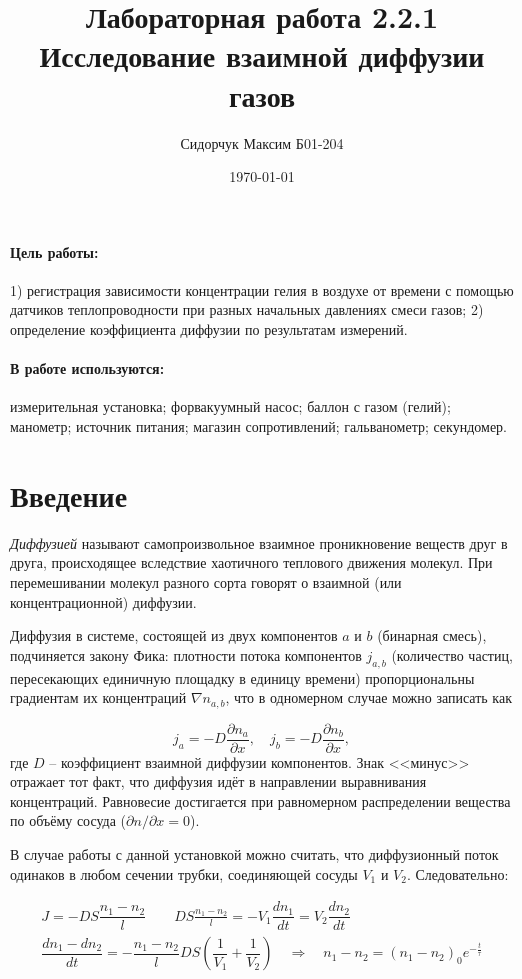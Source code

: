 \documentclass[a4paper,12pt]{article}
\author{Сидорчук Максим Б01-204}
\title{Лабораторная работа 2.2.1 \\
	\textbf{Исследование взаимной диффузии газов}}
\date{\today}
\theoremstyle{definition}
\begin{document}
{\Large \maketitle}

\paragraph*{Цель работы:} 1) регистрация зависимости концентрации гелия в воздухе от времени с помощью датчиков теплопроводности при разных начальных давлениях смеси газов; 2) определение коэффициента диффузии по результатам измерений.

\paragraph*{В работе используются:} измерительная установка; форвакуумный насос; баллон с газом  (гелий); манометр; источник питания; магазин сопротивлений; гальванометр; секундомер.

\section{Введение}

\textit{Диффузией} называют самопроизвольное взаимное проникновение веществ друг в друга, происходящее вследствие хаотичного теплового движения молекул. При перемешивании молекул разного сорта говорят о взаимной (или концентрационной) диффузии.

Диффузия в системе, состоящей из двух компонентов $ a $ и $ b $ (бинарная смесь), подчиняется закону Фика: плотности потока компонентов $ j_{a,b} $ (количество частиц, пересекающих единичную площадку в единицу времени) пропорциональны градиентам их концентраций $ \nabla n_{a,b}$, что в одномерном случае можно записать как

\[ j_a = -D\dfrac{\partial n_a}{\partial x}, \quad j_b = -D\dfrac{\partial n_b}{\partial x}, \]
где $ D $ -- коэффициент взаимной диффузии компонентов. Знак <<минус>> отражает тот факт, что диффузия идёт в направлении выравнивания концентраций. Равновесие достигается при равномерном распределении вещества по объёму сосуда ($ \partial n / \partial x = 0 $).

В случае работы с данной установкой можно считать, что диффузионный поток одинаков в любом сечении трубки, соединяющей сосуды $V_1$ и $V_2$. Следовательно:

\begin{align}
	J = -DS\dfrac{n_1-n_2}{l} \qquad DS\frac{n_1-n_2}{l} = -V_1\dfrac{dn_1}{dt} = V_2\dfrac{dn_2}{dt} \\
	\dfrac{dn_1 - dn_2}{dt} = -\dfrac{n_1-n_2}{l}DS\left(\dfrac{1}{V_1}+\dfrac{1}{V_2}\right) \quad\Rightarrow\quad n_1-n_2 = (n_1-n_2)_0 e^{-\frac{t}{\tau}}
\end{align}
\end{document}
